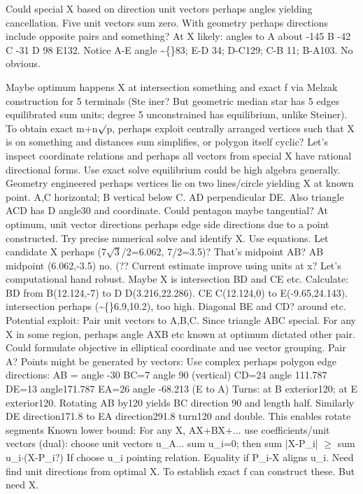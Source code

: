 \begin{decodedreasoningpanel}
Could special X based on direction unit vectors perhaps angles yielding cancellation. Five unit vectors sum zero. With geometry perhaps directions include opposite pairs and something? At X likely:
angles to A about -145
B -42
C -31
D 98
E132.
Notice A-E angle \textasciitilde\{\}83; E-D 34; D-C129; C-B 11; B-A103. No obvious.

Maybe optimum happens X at intersection something and exact f via Melzak construction for 5 terminals (Ste
  iner? But geometric median star has 5 edges equilibrated sum units; degree 5 unconstrained has equilibrium, unlike Steiner). To obtain exact m+n\ensuremath{\surd}p, perhaps exploit centrally arranged vertices such that X is on something and distances sum simplifies, or polygon itself cyclic? Let's inspect coordinate relations and perhaps all vectors from special X have rational directional forms. Use exact solve equilibrium could be high algebra generally. Geometry engineered perhaps vertices lie on two lines/circle yielding X at known point. A,C horizontal; B vertical below C. AD perpendicular DE. Also triangle ACD has D angle30 and coordinate. Could pentagon maybe tangential? At optimum, unit vector directions perhaps edge side directions due to a point constructed. Try precise numerical solve and identify X. Use equations. Let candidate X perhaps (7\ensuremath{\sqrt{3}}/2=6.062, 7/2=3.5)? That's midpoint AB? AB midpoint (6.062,-3.5) no. (?? Current estimate improve using units at x? Let's computational hand robust. Maybe X is intersection BD and CE etc. Calculate: BD from B(12.124,-7) to D D(3.216,22.286). CE C(12.124,0) to E(-9.65,24.143). intersection perhaps (\textasciitilde\{\}6.9,10.2), too high. Diagonal BE and CD? around etc. Potential exploit: Pair unit vectors to A,B,C. Since triangle ABC special. For any X in some region, perhaps angle AXB etc known at optimum dictated other pair. Could formulate objective in elliptical coordinate and use vector grouping. Pair A? Points might be generated by vectors: Use complex perhaps polygon edge directions: AB = angle -30 BC=7 angle 90 (vertical) CD=24 angle 111.787 DE=13 angle171.787 EA=26 angle -68.213 (E to A) Turns: at B exterior120; at E exterior120. Rotating AB by120 yields BC direction 90 and length half. Similarly DE direction171.8 to EA direction291.8 turn120 and double. This enables rotate segments Known lower bound: For any X, AX+BX+... use coefficients/unit vectors (dual): choose unit vectors u\_A... sum u\_i=0; then sum |X-P\_i| \ensuremath{\geq} sum u\_i\ensuremath{\cdot}(X-P\_i?) If choose u\_i pointing relation. Equality if P\_i-X aligns u\_i. Need find
  unit directions from optimal X. To establish exact f can construct these. But need X.


\end{decodedreasoningpanel}
